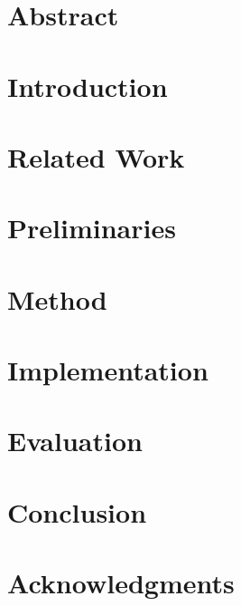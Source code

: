 \documentclass[a4paper,11pt,twoside]{pads-thesis}
\begin{document}

\gTitlePage

\chapter*{Abstract} 


\tableofcontents

\cleardoublepage
\pagestyle{fancy}

\chapter{Introduction} \label{chap:intro}


\chapter{Related Work} \label{chap:related_work}


\chapter{Preliminaries} \label{chap:prelim}


\chapter{Method} \label{chap:method}


\chapter{Implementation} \label{chap:impl}


\chapter{Evaluation} \label{chap:eval}


\chapter{Conclusion} \label{chap:conclusion}



\chapter*{Acknowledgments}


\end{document}
